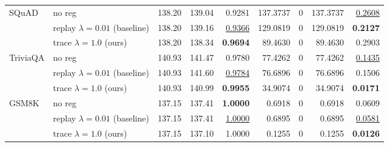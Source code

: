 \begin{table}[t]
{\begin{tabular}{l l rrrrrrr}
\midrule
SQuAD & no reg & 138.20 & 139.04 & \cellcolor{red!18} 0.9281 & \cellcolor{red!18} 137.3737 & \cellcolor{cyan!12} $0$ & \cellcolor{red!18} 137.3737 & \cellcolor{red!18} \underline{0.2608} \\
 & replay $\lambda{=}0.01$ (baseline) & 138.20 & 139.16 & \cellcolor{red!18} \underline{0.9366} & \cellcolor{red!18} 129.0819 & \cellcolor{cyan!12} $0$ & \cellcolor{red!18} 129.0819 & \cellcolor{red!18} \textbf{0.2127} \\
 & trace $\lambda{=}1.0$ (ours) & 138.20 & 138.34 & \textbf{0.9694} & 89.4630 & \cellcolor{cyan!12} $0$ & 89.4630 & 0.2903 \\
\midrule
TriviaQA & no reg & 140.93 & 141.47 & 0.9780 & 77.4262 & \cellcolor{cyan!12} $0$ & 77.4262 & \underline{0.1435} \\
 & replay $\lambda{=}0.01$ (baseline) & 140.93 & 141.60 & \underline{0.9784} & 76.6896 & \cellcolor{cyan!12} $0$ & 76.6896 & 0.1506 \\
 & trace $\lambda{=}1.0$ (ours) & 140.93 & 140.99 & \textbf{0.9955} & 34.9074 & \cellcolor{cyan!12} $0$ & 34.9074 & \textbf{0.0171} \\
\midrule
GSM8K & no reg & 137.15 & 137.41 & \textbf{1.0000} & 0.6918 & \cellcolor{cyan!12} $0$ & 0.6918 & 0.0609 \\
 & replay $\lambda{=}0.01$ (baseline) & 137.15 & 137.41 & \underline{1.0000} & 0.6895 & \cellcolor{cyan!12} $0$ & 0.6895 & \underline{0.0581} \\
 & trace $\lambda{=}1.0$ (ours) & 137.15 & 137.10 & 1.0000 & 0.1255 & \cellcolor{cyan!12} $0$ & 0.1255 & \textbf{0.0126} \\
\bottomrule
\end{tabular}}
\end{table}